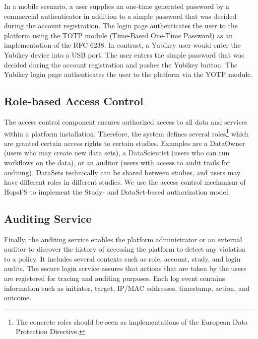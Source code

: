 In a mobile scenario, a user supplies an one-time generated password by a commercial authenticator in addition to a simple password that was decided during the account registration. The login page authenticates the user to the platform using the TOTP module (Time-Based One-Time Password) as an implementation of the RFC 6238.  In contrast, a Yubikey user would enter the Yubikey device into a USB port. The user enters the simple password that was decided during the account registration and pushes the Yubikey button. The Yubikey login page authenticates the user to the platform via the YOTP module.

\subsection {Role-based Access Control}

The access control component ensures authorized access to all data and services within a platform installation. Therefore, the system defines several roles\footnote{The concrete roles should be seen as implementations of the European Data Protection Directive.} which are granted certain access rights to certain studies. Examples are a DataOwner (users who may create new data sets), a DataScientist (users who can run workflows on the data), or an auditor (users with access to audit trails for auditing). DataSets technically can be shared between studies, and users may have different roles in different studies. We use the access control mechanism of HopsFS to implement the Study- and DataSet-based authorization model. 

\subsection {Auditing Service}
Finally, the auditing service enables the platform administrator or an external auditor to discover the history of accessing the platform to detect any violation to a policy. It includes several contexts such as role, account, study, and login audits. The secure login service assures that actions that are taken by the users are registered for tracing and auditing purposes. Each log event contains information such as initiator, target, IP/MAC addresses, timestamp, action, and outcome.
